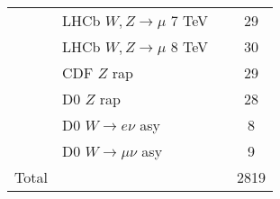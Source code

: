 \begin{center}
\begin{tabular}{|c|l|c|c|}
& LHCb $W, Z \to \mu$ 7 TeV  &  \cite{Aaij:2015gna}    & 29  &   \\
& LHCb $W, Z \to \mu$ 8 TeV &  \cite{Aaij:2015zlq}     & 30  &      \\
& CDF $Z$ rap    &  \cite{Aaltonen:2010zza}       & 29   &     \\
& D0 $Z$ rap    &  \cite{Abazov:2007jy}        & 28  &     \\
& D0 $W\to e\nu$ asy  & \cite{D0:2014kma}         & 8  &     \\
& D0 $W\to\mu\nu$ asy     &  \cite{Abazov:2013rja}        &  9 &   \\
\fi
\bottomrule
Total    &         &        & 2819   \\
\bottomrule
\end{tabular}
\end{center}
